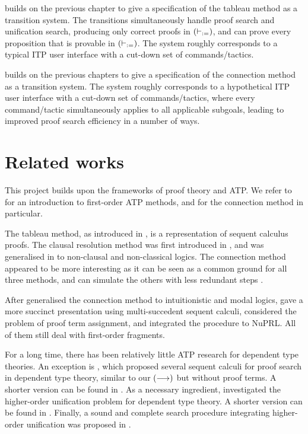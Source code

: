 \documentclass[twoside]{report}
\begin{document}
 builds on the previous chapter to give a specification of the tableau method as a transition system. The transitions simultaneously handle proof search and unification search, producing only correct proofs in $(\vdash_{:=})$, and can prove every proposition that is provable in $(\vdash_{:=})$. The system roughly corresponds to a typical ITP user interface with a cut-down set of commands/tactics.

 builds on the previous chapters to give a specification of the connection method as a transition system. The system roughly corresponds to a hypothetical ITP user interface with a cut-down set of commands/tactics, where every command/tactic simultaneously applies to all applicable subgoals, leading to improved proof search efficiency in a number of ways.

\section{Related works}
\label{sec:related_works}

This project builds upon the frameworks of proof theory and ATP. We refer to \cite{harrison2009handbook,pfenning2004automated} for an introduction to first-order ATP methods, and \cite{bibel1983matings,waaler2001connections} for the connection method in particular.

The tableau method, as introduced in \cite{smullyan1968first,fitting1972tableau}, is a representation of sequent calculus proofs. The clausal resolution method was first introduced in \cite{robinson1965machine}, and was generalised in \cite{mints1988gentzen,tammet1997resolution} to non-clausal and non-classical logics. The connection method \cite{prawitz1968proof,andrews1981theorem,bibel1981matrices} appeared to be more interesting as it can be seen as a common ground for all three methods, and can simulate the others with less redundant steps \cite{bibel1982comparative}.

After \cite{wallen1987automated} generalised the connection method to intuitionistic and modal logics, \cite{waaler2001connections} gave a more succinct presentation using multi-succedent sequent calculi, \cite{schmitt1995transforming,schmitt1996converting} considered the problem of proof term assignment, and \cite{kreitz2000matrix} integrated the procedure to NuPRL. All of them still deal with first-order fragments.

For a long time, there has been relatively little ATP research for dependent type theories. An exception is \cite{pym1990proofs}, which proposed several sequent calculi for proof search in dependent type theory, similar to our $(\longrightarrow)$ but without proof terms. A shorter version can be found in \cite{pym1990investigations}. As a necessary ingredient, \cite{elliott1990extensions} investigated the higher-order unification problem for dependent type theory. A shorter version can be found in \cite{elliott1989higher}. Finally, a sound and complete search procedure integrating higher-order unification was proposed in \cite{dowek1993complete}.
\end{document}
